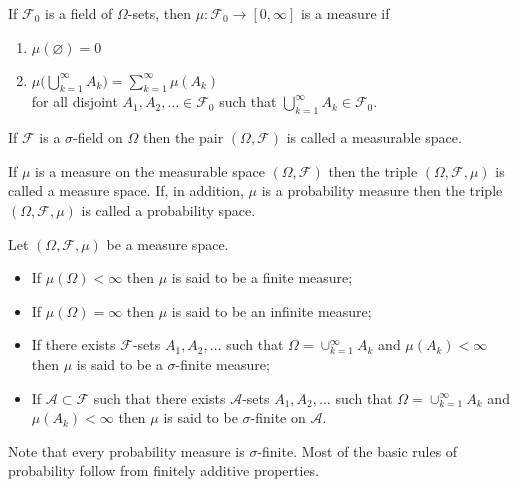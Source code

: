 \begin{definition}[{\bf Measure}]
If $\mathcal F_0$ is a field of $\Omega$-sets, then $\mu:\mathcal F_0\rightarrow [0,\infty]$ is a {measure} if
\begin{enumerate}
\item $\mu(\varnothing)=0$
\item $\mu\bigl( \bigcup_{k=1}^\infty A_k \bigr)=\sum_{k=1}^\infty \mu(A_k)$ \\ for all disjoint $A_1, A_2,\ldots \in\mathcal F_0$ such that $\bigcup_{k=1}^\infty A_k \in \mathcal F_0$.
\end{enumerate}
\end{definition}



\begin{definition}
If $\mathcal F$ is a $\sigma$-field on $\Omega$ then the pair $(\Omega, \mathcal F)$  is called a {measurable space}.
\end{definition}


\begin{definition}
If $\mu$ is a measure on the measurable space $(\Omega, \mathcal F)$ then the triple $(\Omega, \mathcal F, \mu)$ is called a {measure space}.
If, in addition, $\mu$ is a probability measure then the triple $(\Omega, \mathcal F, \mu)$ is called a {probability space}.
\end{definition}


\begin{definition}
Let $(\Omega, \mathcal F,\mu)$ be a measure space.
\begin{itemize}
\item If $\mu(\Omega)<\infty$ then $\mu$ is said to be a {finite} measure;
\item If $\mu(\Omega)=\infty$ then $\mu$ is said to be an {infinite} measure;
\item If there exists $\mathcal F$-sets $A_1,A_2,\ldots$ such that $\Omega = \cup_{k=1}^\infty A_k$ and $\mu(A_k)<\infty$ then $\mu$ is said to be a {$\sigma$-finite} measure;
\item If $\mathscr A\subset \mathcal F$ such that there exists $\mathscr A$-sets $A_1,A_2,\ldots$ such that $\Omega = \cup_{k=1}^\infty A_k$ and $\mu(A_k)<\infty$ then $\mu$ is said to be {$\sigma$-finite on $\mathscr A$}.
\end{itemize}
\end{definition}


Note that every probability measure is  $\sigma$-finite. Most of the basic rules of probability follow from  finitely additive properties.

